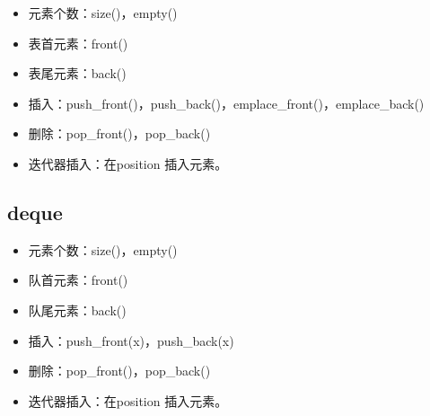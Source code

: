 \documentclass[letterpaper,10pt,english]{sphinxmanual}
\begin{document}
\begin{itemize}
\item {} 
元素个数：size()，empty()

\item {} 
表首元素：front()

\item {} 
表尾元素：back()

\item {} 
插入：push\_front()，push\_back()，emplace\_front()，emplace\_back()

\item {} 
删除：pop\_front()，pop\_back()

\item {} 
迭代器插入：在position  插入元素。

%
\begin{sphinxVerbatim}[commandchars=\\\{\}]
      
\end{sphinxVerbatim}

\end{itemize}


\subsection{deque}
\label{\detokenize{cpp/19_stl:deque}}
%
\begin{sphinxVerbatim}[commandchars=\\\{\}]
\end{sphinxVerbatim}

\begin{itemize}
\item {} 
元素个数：size()，empty()

\item {} 
队首元素：front()

\item {} 
队尾元素：back()

\item {} 
插入：push\_front(x)，push\_back(x)

\item {} 
删除：pop\_front()，pop\_back()

\item {} 
迭代器插入：在position  插入元素。

%
\begin{sphinxVerbatim}[commandchars=\\\{\}]
      
\end{sphinxVerbatim}

\end{itemize}
\end{document}

